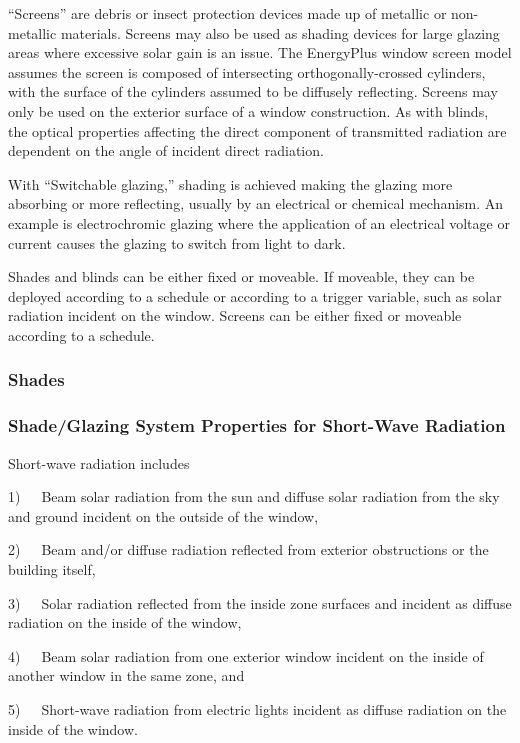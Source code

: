 ``Screens'' are debris or insect protection devices made up of metallic or non-metallic materials. Screens may also be used as shading devices for large glazing areas where excessive solar gain is an issue. The EnergyPlus window screen model assumes the screen is composed of intersecting orthogonally-crossed cylinders, with the surface of the cylinders assumed to be diffusely reflecting. Screens may only be used on the exterior surface of a window construction. As with blinds, the optical properties affecting the direct component of transmitted radiation are dependent on the angle of incident direct radiation.

With ``Switchable glazing,'' shading is achieved making the glazing more absorbing or more reflecting, usually by an electrical or chemical mechanism. An example is electrochromic glazing where the application of an electrical voltage or current causes the glazing to switch from light to dark.

Shades and blinds can be either fixed or moveable. If moveable, they can be deployed according to a schedule or according to a trigger variable, such as solar radiation incident on the window. Screens can be either fixed or moveable according to a schedule.

\subsubsection{Shades}\label{shades}

\subsubsection{Shade/Glazing System Properties for Short-Wave Radiation}\label{shadeglazing-system-properties-for-short-wave-radiation}

Short-wave radiation includes

1)~~~Beam solar radiation from the sun and diffuse solar radiation from the sky and ground incident on the outside of the window,

2)~~~Beam and/or diffuse radiation reflected from exterior obstructions or the building itself,

3)~~~Solar radiation reflected from the inside zone surfaces and incident as diffuse radiation on the inside of the window,

4)~~~Beam solar radiation from one exterior window incident on the inside of another window in the same zone, and

5)~~~Short-wave radiation from electric lights incident as diffuse radiation on the inside of the window.

